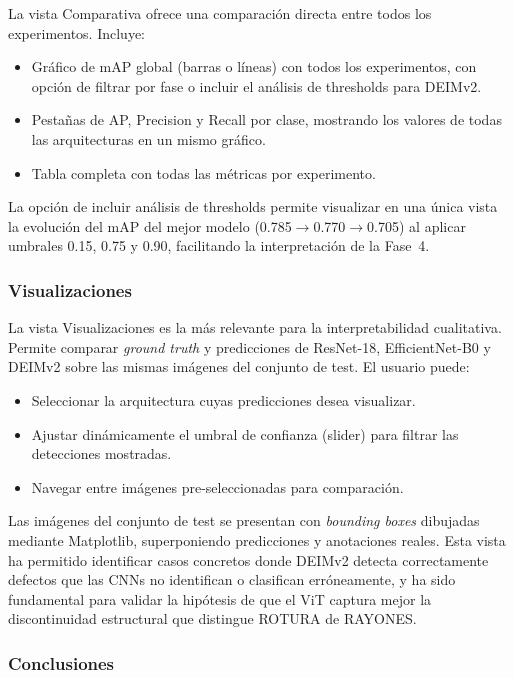 La vista Comparativa ofrece una comparación directa entre todos los experimentos. Incluye:

\begin{itemize}
    \item Gráfico de mAP global (barras o líneas) con todos los experimentos, con opción de filtrar por fase o incluir el análisis de thresholds para DEIMv2.
    \item Pestañas de AP, Precision y Recall por clase, mostrando los valores de todas las arquitecturas en un mismo gráfico.
    \item Tabla completa con todas las métricas por experimento.
\end{itemize}

La opción de incluir análisis de thresholds permite visualizar en una única vista la evolución del mAP del mejor modelo (0.785$\rightarrow$0.770$\rightarrow$0.705) al aplicar umbrales 0.15, 0.75 y 0.90, facilitando la interpretación de la Fase~4.

\subsubsection{Visualizaciones}

La vista Visualizaciones es la más relevante para la interpretabilidad cualitativa. Permite comparar \textit{ground truth} y predicciones de ResNet-18, EfficientNet-B0 y DEIMv2 sobre las mismas imágenes del conjunto de test. El usuario puede:

\begin{itemize}
    \item Seleccionar la arquitectura cuyas predicciones desea visualizar.
    \item Ajustar dinámicamente el umbral de confianza (slider) para filtrar las detecciones mostradas.
    \item Navegar entre imágenes pre-seleccionadas para comparación.
\end{itemize}

Las imágenes del conjunto de test se presentan con \textit{bounding boxes} dibujadas mediante Matplotlib, superponiendo predicciones y anotaciones reales. Esta vista ha permitido identificar casos concretos donde DEIMv2 detecta correctamente defectos que las CNNs no identifican o clasifican erróneamente, y ha sido fundamental para validar la hipótesis de que el \acrshort{ViT} captura mejor la discontinuidad estructural que distingue ROTURA de RAYONES.

\subsubsection{Conclusiones}

